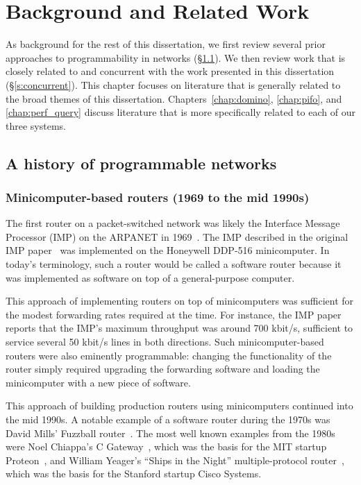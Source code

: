 \chapter{Background and Related Work}
\label{chap:related}

As background for the rest of this dissertation, we first review several prior
approaches to programmability in networks (\S\ref{s:bgnd_bgnd}). We then review
work that is closely related to and concurrent with the work presented in this
dissertation (\S\ref{s:concurrent}).  This chapter focuses on literature that
is generally related to the broad themes of this dissertation.
Chapters~\ref{chap:domino}, \ref{chap:pifo}, and \ref{chap:perf_query} discuss
literature that is more specifically related to each of our three systems.

\section{A history of programmable networks}
\label{s:bgnd_bgnd}

\subsection{Minicomputer-based routers (1969 to the mid 1990s)}
The first router on a packet-switched network was likely the Interface Message
Processor (IMP) on the ARPANET in 1969~\cite{imp}. The IMP described in the
original IMP paper~\cite{imp} was implemented on the Honeywell DDP-516
minicomputer. In today's terminology, such a router would be called a software
router because it was implemented as software on top of a general-purpose
computer.

This approach of implementing routers on top of minicomputers was sufficient
for the modest forwarding rates required at the time. For instance, the IMP
paper reports that the IMP's maximum throughput was around 700 kbit/s,
sufficient to service several 50 kbit/s lines in both directions.  Such
minicomputer-based routers were also eminently programmable: changing the
functionality of the router simply required upgrading the forwarding software
and loading the minicomputer with a new piece of software.

This approach of building production routers using minicomputers continued into
the mid 1990s.  A notable example of a software router during the 1970s was David
Mills' Fuzzball router~\cite{fuzzball}. The most well known examples from the
1980s were Noel Chiappa's C Gateway~\cite{cgw}, which was the basis for the MIT
startup Proteon~\cite{proteon}, and William Yeager's ``Ships in the Night''
multiple-protocol router~\cite{ships}, which was the basis for the Stanford
startup Cisco Systems.

